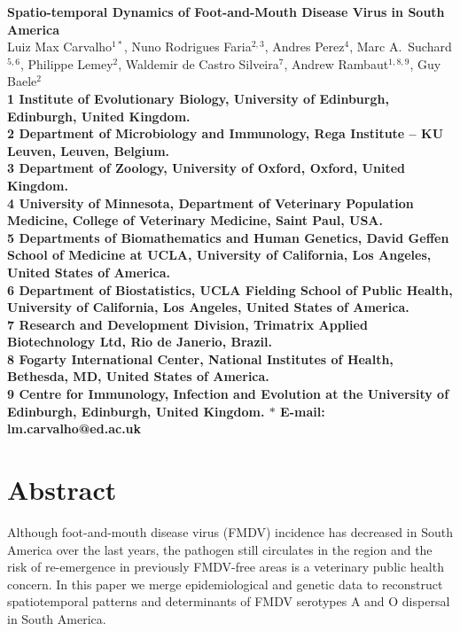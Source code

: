 \documentclass[10pt]{article}
\date{}
\begin{document}
\begin{flushleft}
{\Large
\textbf{Spatio-temporal Dynamics of Foot-and-Mouth Disease Virus in South America}
}
\\
Luiz Max Carvalho$^{1\ast}$,
Nuno Rodrigues Faria$^{2,3}$,
Andres Perez$^{4}$,
Marc A.~Suchard$^{5,6}$,
Philippe Lemey$^{2}$,
Waldemir de Castro Silveira$^{7}$,
Andrew Rambaut$^{1,8,9}$,
Guy Baele$^{2}$
\\
\bf{1} Institute of Evolutionary Biology, University of Edinburgh, Edinburgh, United Kingdom.\\
\bf{2} Department of Microbiology and Immunology, Rega Institute -- KU Leuven, Leuven, Belgium.\\
\bf{3} Department of Zoology, University of Oxford, Oxford, United Kingdom.\\
\bf{4} University of Minnesota, Department of Veterinary Population Medicine, College of Veterinary Medicine, Saint Paul, USA.\\
\bf{5} Departments of Biomathematics and Human Genetics, David Geffen School of Medicine at UCLA, University of California, Los Angeles,  United States of America.\\
\bf{6} Department of Biostatistics, UCLA Fielding School of Public Health, University of California, Los Angeles,  United States of America.\\
\bf{7} Research and Development Division, Trimatrix Applied Biotechnology Ltd, Rio de Janerio, Brazil.\\
\bf{8} Fogarty International Center, National Institutes of Health, Bethesda, MD,  United States of America.\\
\bf{9} Centre for Immunology, Infection and Evolution at the University of Edinburgh, Edinburgh, United Kingdom.
$\ast$ E-mail: lm.carvalho@ed.ac.uk
\end{flushleft}
\section*{Abstract}
Although foot-and-mouth disease virus (FMDV) incidence has decreased in South America over the last years, the pathogen still circulates in the region and the risk of re-emergence in previously FMDV-free areas is a veterinary public health concern.
In this paper we merge epidemiological and genetic data to reconstruct spatiotemporal patterns and determinants of FMDV serotypes A and O dispersal in South America.
\end{document}

